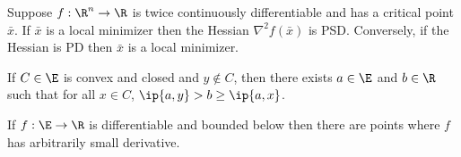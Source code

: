 \documentclass[../borwein-lewis_notes.tex]{subfiles}
\begin{document}
\begin{theorem}
Suppose $f:\R^n\to\R$ is twice continuously differentiable and has a 
critical point $\bar x$. If $\bar x$ is a local minimizer then the Hessian
$\nabla^2 f(\bar x)$ is PSD. Conversely, if the Hessian is PD then 
$\bar x$ is a local minimizer.
\end{theorem}
\begin{theorem}
If $C\in\E$ is convex and closed and $y\notin C$, then there exists 
$a\in\E$ and $b\in\R$ such that for all $x\in C$, 
$\ip{a,y} > b \geq \ip{a, x}$.
\end{theorem}
\begin{proposition}[2.1.7]
If $f:\E\to\R$ is differentiable and bounded below then there are 
points where $f$ has arbitrarily small derivative.
\end{proposition}
\end{document}
